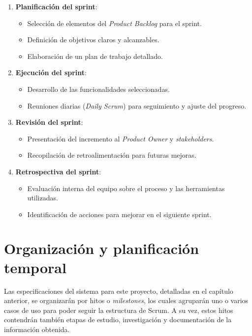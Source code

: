 \begin{enumerate} 
	\item \textbf{Planificación del sprint}: 
		\begin{itemize} 
			\item Selección de elementos del \textit{Product Backlog} para el sprint. \item Definición de objetivos claros y alcanzables. 
			\item Elaboración de un plan de trabajo detallado. 
		\end{itemize} 
	
	\item \textbf{Ejecución del sprint}: 
		\begin{itemize} 
			\item Desarrollo de las funcionalidades seleccionadas. 
			\item Reuniones diarias (\textit{Daily Scrum}) para seguimiento y ajuste del progreso. 
		\end{itemize} 
	
	\item \textbf{Revisión del sprint}: 
		\begin{itemize} 
			\item Presentación del incremento al \textit{Product Owner} y \textit{stakeholders}. 
			\item Recopilación de retroalimentación para futuras mejoras.
		\end{itemize} 
	
	\item \textbf{Retrospectiva del sprint}: 
		\begin{itemize} 
			\item Evaluación interna del equipo sobre el proceso y las herramientas utilizadas. 
			\item Identificación de acciones para mejorar en el siguiente sprint. 
		\end{itemize} 
	
\end{enumerate}



\section{Organización y planificación temporal}
Las especificaciones del sistema para este proyecto, detalladas en el capítulo anterior, se organizarán por hitos o \textit{milestones}, los cuales agruparán uno o varios casos de uso para poder seguir la estructura de Scrum. A su vez, estos hitos contendrán también etapas de estudio, investigación y documentación de la información obtenida. 


